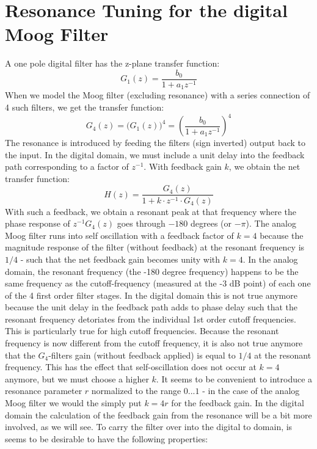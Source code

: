 \section{Resonance Tuning for the digital Moog Filter}
A one pole digital filter has the z-plane transfer function:
\begin{equation}
 G_1(z) = \frac{b_0}{1 + a_1 z^{-1}}
\end{equation}
When we model the Moog filter (excluding resonance) with a series connection of 4 such filters, we get the transfer function:
\begin{equation}
 G_4(z) = \big( G_1(z) \big)^4 = \left( \frac{b_0}{1 + a_1 z^{-1}} \right)^4
\end{equation}
The resonance is introduced by feeding the filters (sign inverted) output back to the input. In the digital domain, we must include a unit delay into the feedback path corresponding to a factor of $z^{-1}$. With feedback gain $k$, we obtain the net transfer function:
\begin{equation}
 H(z) = \frac{G_4(z)} {1 + k \cdot z^{-1} \cdot G_4(z)}
\end{equation}
With such a feedback, we obtain a resonant peak at that frequency where the phase response of $z^{-1} G_4(z)$ goes through $-180$ degrees (or $-\pi$). The analog Moog filter runs into self oscillation with a feedback factor of $k=4$ because the magnitude response of the filter (without feedback) at the resonant frequency is $1/4$ - such that the net feedback gain becomes unity with $k=4$. In the analog domain, the resonant frequency (the -180 degree frequency) happens to be the same frequency as the cutoff-frequency (measured at the -3 dB point) of each one of the 4 first order filter stages. In the digital domain this is not true anymore because the unit delay in the feedback path adds to phase delay such that the resonant frequency detoriates from the individual 1st order cutoff frequencies. This is particularly true for high cutoff frequencies. Because the resonant frequency is now different from the cutoff frequency, it is also not true anymore that the $G_4$-filters gain (without feedback applied) is equal to $1/4$ at the resonant frequency. This has the effect that self-oscillation does not occur at $k=4$ anymore, but we must choose a higher $k$. It seems to be convenient to introduce a resonance parameter $r$ normalized to the range $0...1$ - in the case of the analog Moog filter we would the simply put $k = 4 r$ for the feedback gain. In the digital domain the calculation of the feedback gain from the resonance will be a bit more involved, as we will see. To carry the filter over into the digital to domain, is seems to be desirable to have the following properties:

